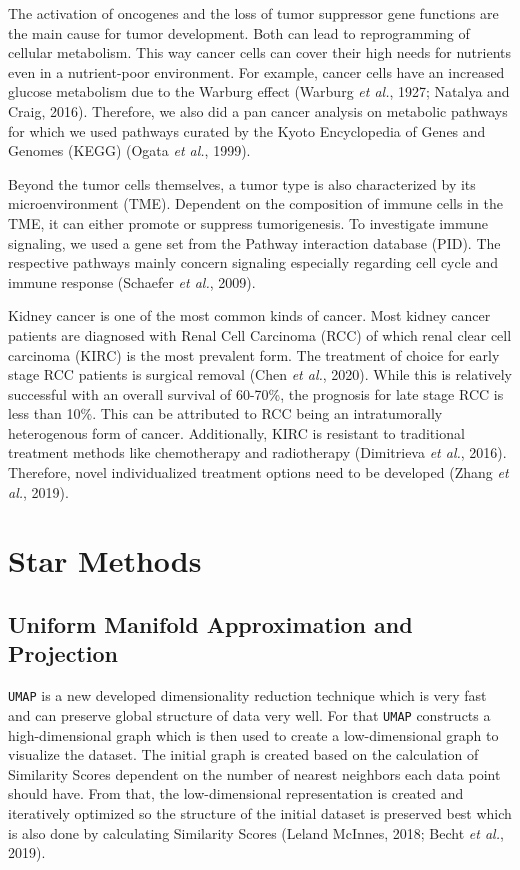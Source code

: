\documentclass[
  parskip,
  openany]{scrreprt}
\begin{document}
The activation of oncogenes and the loss of tumor suppressor gene
functions are the main cause for tumor development. Both can lead to
reprogramming of cellular metabolism. This way cancer cells can cover
their high needs for nutrients even in a nutrient-poor environment. For
example, cancer cells have an increased glucose metabolism due to the
Warburg effect (Warburg \emph{et al.}, 1927; Natalya and Craig, 2016).
Therefore, we also did a pan cancer analysis on metabolic pathways for
which we used pathways curated by the Kyoto Encyclopedia of Genes and
Genomes (KEGG) (Ogata \emph{et al.}, 1999).

Beyond the tumor cells themselves, a tumor type is also characterized by
its microenvironment (TME). Dependent on the composition of immune cells
in the TME, it can either promote or suppress tumorigenesis. To
investigate immune signaling, we used a gene set from the Pathway
interaction database (PID). The respective pathways mainly concern
signaling especially regarding cell cycle and immune response (Schaefer
\emph{et al.}, 2009).

Kidney cancer is one of the most common kinds of cancer. Most kidney
cancer patients are diagnosed with Renal Cell Carcinoma (RCC) of which
renal clear cell carcinoma (KIRC) is the most prevalent form. The
treatment of choice for early stage RCC patients is surgical removal
(Chen \emph{et al.}, 2020). While this is relatively successful with an
overall survival of 60-70\%, the prognosis for late stage RCC is less
than 10\%. This can be attributed to RCC being an intratumorally
heterogenous form of cancer. Additionally, KIRC is resistant to
traditional treatment methods like chemotherapy and radiotherapy
(Dimitrieva \emph{et al.}, 2016). Therefore, novel individualized
treatment options need to be developed (Zhang \emph{et al.}, 2019).

\hypertarget{star-methods}{%
\section{Star Methods}\label{star-methods}}

\hypertarget{uniform-manifold-approximation-and-projection}{%
\subsection{Uniform Manifold Approximation and
Projection}\label{uniform-manifold-approximation-and-projection}}

\texttt{UMAP} is a new developed dimensionality reduction technique
which is very fast and can preserve global structure of data very well.
For that \texttt{UMAP} constructs a high-dimensional graph which is then
used to create a low-dimensional graph to visualize the dataset. The
initial graph is created based on the calculation of Similarity Scores
dependent on the number of nearest neighbors each data point should
have. From that, the low-dimensional representation is created and
iteratively optimized so the structure of the initial dataset is
preserved best which is also done by calculating Similarity Scores
(Leland McInnes, 2018; Becht \emph{et al.}, 2019).
\end{document}
